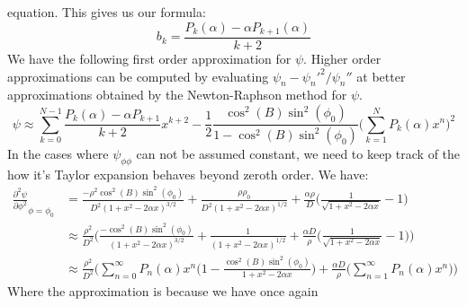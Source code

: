\documentclass[crop=false,class=book,oneside]{standalone}
\begin{document}
            equation. This gives us our formula:
            \begin{equation*}
                b_{k}=\frac{P_{k}(\alpha)-\alpha{P}_{k+1}(\alpha)}{k+2}
            \end{equation*}
            We have the following first order approximation
            for $\psi$. Higher order approximations can be
            computed by evaluating
            $\psi_{n}-\psi_{n}'^{2}/\psi_{n}''$
            at better approximations obtained by the
            Newton-Raphson method for $\psi$.
            \begin{equation*}
                \psi\approx
                \sum_{k=0}^{N-1}
                \frac{P_{k}(\alpha)-\alpha{P}_{k+1}}{k+2}x^{k+2}
                -\frac{1}{2}
                \frac{\cos^{2}(B)\sin^{2}(\phi_{0})}
                     {1-\cos^{2}(B)\sin^{2}(\phi_{0})}
                \Big(\sum_{k=1}^{N}P_{k}(\alpha)x^{n}\Big)^{2}
            \end{equation*}
            In the cases where $\psi_{\phi\phi}$ can not be assumed
            constant, we need to keep track of the how it's Taylor
            expansion behaves beyond zeroth order. We have:
            \begin{align*}
                \frac{\partial^{2}\psi}
                     {\partial\phi^{2}}_{\phi=\phi_{0}}
                &=\frac{-\rho^{2}\cos^{2}(B)\sin^{2}(\phi_{0})}
                       {D^{2}(1+x^{2}-2\alpha{x})^{3/2}}
                  +\frac{\rho\rho_{0}}{D^{2}(1+x^{2}-2\alpha{x})^{1/2}}
                  +\frac{\alpha\rho}{D}
                  \Big(\frac{1}{\sqrt{1+x^{2}-2\alpha{x}}}-1\Big)\\
                &\approx\frac{\rho^{2}}{D^{2}}\bigg(
                    \frac{-\cos^{2}(B)\sin^{2}(\phi_{0})}
                         {(1+x^{2}-2\alpha{x})^{3/2}}+
                    \frac{1}{(1+x^{2}-2\alpha{x})^{1/2}}+
                    \frac{\alpha{D}}{\rho}
                    \Big(\frac{1}{\sqrt{1+x^{2}-2\alpha{x}}}-1\Big)
                \bigg)\\
                &\approx\frac{\rho^{2}}{D^{2}}\bigg(
                    \sum_{n=0}^{\infty}P_{n}(\alpha)x^{n}
                    \Big(1-\frac{\cos^{2}(B)\sin^{2}(\phi_{0})}
                                {1+x^{2}-2\alpha{x}}\Big)+
                    \frac{\alpha{D}}{\rho}
                    \Big(\sum_{n=1}^{\infty}P_{n}(\alpha)x^{n}\Big)
                \bigg)
            \end{align*}
            Where the approximation is because we have once again
\end{document}
